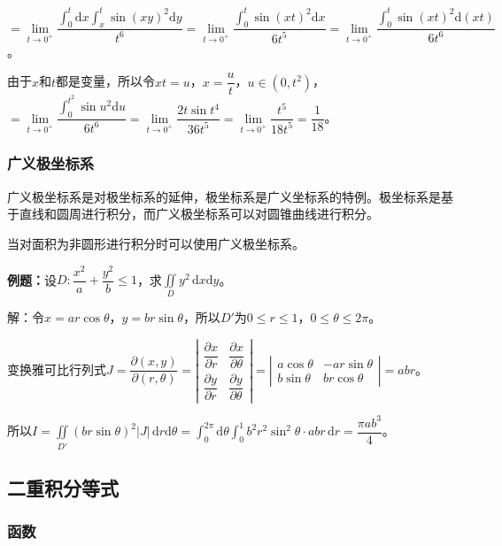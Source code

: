 \documentclass[UTF8, 12pt]{ctexart}
\begin{document}
$=\lim\limits_{t\to0^+}\dfrac{\int_0^t\textrm{d}x\int_x^t\sin(xy)^2\textrm{d}y}{t^6}=\lim\limits_{t\to0^+}\dfrac{\int_0^t\sin(xt)^2\textrm{d}x}{6t^5}=\lim\limits_{t\to0^+}\dfrac{\int_0^t\sin(xt)^2\textrm{d}(xt)}{6t^6}$。

由于$x$和$t$都是变量，所以令$xt=u$，$x=\dfrac{u}{t}$，$u\in(0,t^2)$，$=\lim\limits_{t\to0^+}\dfrac{\int_0^{t^2}\sin u^2\textrm{d}u}{6t^6}=\lim\limits_{t\to0^+}\dfrac{2t\sin t^4}{36t^5}=\lim\limits_{t\to0^+}\dfrac{t^5}{18t^5}=\dfrac{1}{18}$。

\subsubsection{广义极坐标系}

广义极坐标系是对极坐标系的延伸，极坐标系是广义坐标系的特例。极坐标系是基于直线和圆周进行积分，而广义极坐标系可以对圆锥曲线进行积分。

当对面积为非圆形进行积分时可以使用广义极坐标系。

\textbf{例题：}设$D:\dfrac{x^2}{a}+\dfrac{y^2}{b}\leqslant1$，求$\iint\limits_Dy^2\,\textrm{d}x\textrm{d}y$。

解：令$x=ar\cos\theta$，$y=br\sin\theta$，所以$D'$为$0\leqslant r\leqslant 1$，$0\leqslant\theta\leqslant2\pi$。

变换雅可比行列式$J=\dfrac{\partial(x,y)}{\partial(r,\theta)}=\left\vert\begin{array}{cc}
    \dfrac{\partial x}{\partial r} & \dfrac{\partial x}{\partial\theta} \\
    \dfrac{\partial y}{\partial r} & \dfrac{\partial y}{\partial\theta}
\end{array}\right\vert=\left\vert\begin{array}{cc}
    a\cos\theta & -ar\sin\theta \\
    b\sin\theta & br\cos\theta
\end{array}\right\vert=abr$。

所以$I=\iint\limits_{D'}(br\sin\theta)^2\vert J\vert\,\textrm{d}r\textrm{d}\theta=\int_0^{2\pi}\textrm{d}\theta\int_0^1b^2r^2\sin^2\theta\cdot abr\,\textrm{d}r=\dfrac{\pi ab^3}{4}$。

\subsection{二重积分等式}

\subsubsection{函数}
\end{document}
